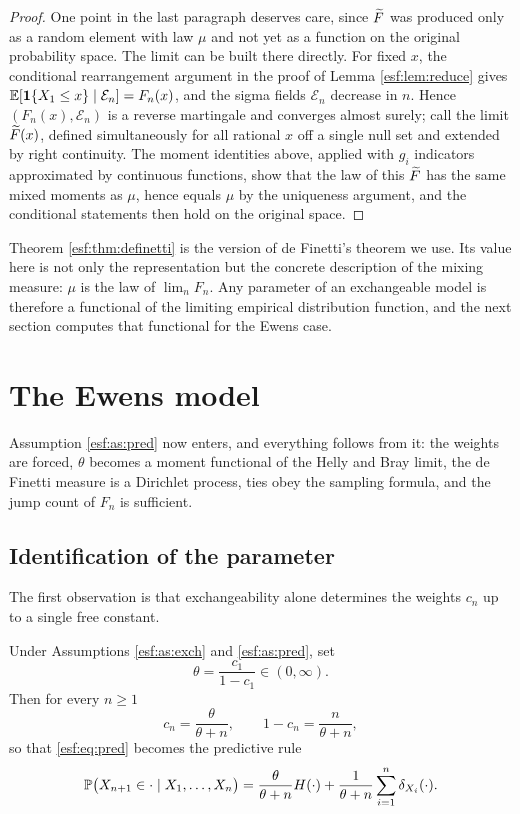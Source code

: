 \begin{proof}
One point in the last paragraph deserves care, since $\widetilde{F}$ was produced only as a
random element with law $\mu$ and not yet as a function on the original probability
space. The limit can be built there directly. For fixed $x$, the conditional
rearrangement argument in the proof of Lemma \ref{esf:lem:reduce} gives
$\mathbb{E}[\mathbf{1}\{X_1 \le x\} \mid \mathcal{E}_n] = F_n(x)$, and the sigma fields
$\mathcal{E}_n$ decrease in $n$. Hence $(F_n(x), \mathcal{E}_n)$ is a reverse
martingale and converges almost surely; call the limit $\widetilde{F}(x)$, defined
simultaneously for all rational $x$ off a single null set and extended by right
continuity. The moment identities above, applied with $g_i$ indicators approximated
by continuous functions, show that the law of this $\widetilde{F}$ has the same mixed moments
as $\mu$, hence equals $\mu$ by the uniqueness argument, and the conditional statements
then hold on the original space.
\end{proof}

Theorem \ref{esf:thm:definetti} is the version of de Finetti's theorem we use. Its value
here is not only the representation but the concrete description of the mixing
measure: $\mu$ is the law of $\lim_n F_n$. Any parameter of an exchangeable model is
therefore a functional of the limiting empirical distribution function, and the next
section computes that functional for the Ewens case.

\section{The Ewens model}
\label{esf:sec:ewens}

Assumption \ref{esf:as:pred} now enters, and everything follows from it: the weights are
forced, $\theta$ becomes a moment functional of the Helly and Bray limit, the de
Finetti measure is a Dirichlet process, ties obey the sampling formula, and the jump
count of $F_n$ is sufficient.

\subsection{Identification of the parameter}
\label{esf:sec:ident}

The first observation is that
exchangeability alone determines the weights $c_n$ up to a single free constant.

\begin{proposition}
\label{esf:prop:weights}
Under Assumptions \ref{esf:as:exch} and \ref{esf:as:pred}, set
\[
\theta = \frac{c_1}{1 - c_1} \in (0,\infty).
\]
Then for every $n \ge 1$
\[
c_n = \frac{\theta}{\theta + n}, \qquad 1 - c_n = \frac{n}{\theta + n},
\]
so that \eqref{esf:eq:pred} becomes the predictive rule
\begin{equation}
\mathbb{P}\bigl(X_{n+1} \in \cdot \mid X_1,\dots,X_n\bigr)
= \frac{\theta}{\theta+n} H(\cdot) + \frac{1}{\theta+n} \sum_{i=1}^{n} \delta_{X_i}(\cdot).
\label{esf:eq:bmq}
\end{equation}
\end{proposition}

